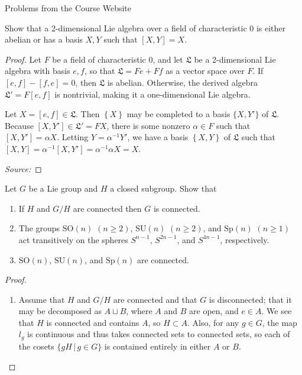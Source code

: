 \documentclass[12pt]{article}
\theoremstyle{definition}
\newenvironment{problem}[2][Problem]{\begin{trivlist}
\item[\hskip \labelsep {\bfseries #1}\hskip \labelsep {\bfseries #2.}]}{\end{trivlist}}
\begin{document}
\begin{section}{Problems from the Course Website}
	\begin{problem}{1}
		Show that a 2-dimensional Lie algebra over a field of characteristic $0$ is either abelian or has a basis $X,Y$ such that $[X,Y] = X$.	
		\begin{proof}
			Let $F$ be a field of characteristic $0$, and let $\mathfrak L$ be a 2-dimensional Lie algebra with basis $e,f$, so that $\mathfrak L = Fe + Ff$ as a vector space over $F$. If $[e,f] -[f,e] = 0$, then $\mathfrak L$ is abelian. Otherwise, the derived algebra $\mathfrak L' = F[e,f]$ is nontrivial, making it a one-dimensional Lie algebra.
			\par Let $X = [e,f] \in \mathfrak L$. Then $\left\{ X \right\}$ may be completed to a basis $\{X, Y'\}$ of $\mathfrak L$. Because $[X, Y'] \in \mathfrak L' = FX$, there is some nonzero $\alpha \in F$ such that $[X,Y'] = \alpha X$. Letting $Y = \alpha^{-1}Y'$, we have a basis $\left\{ X,Y \right\}$ of $\mathfrak L$ such that $[X,Y] = \alpha^{-1}[X,Y'] = \alpha^{-1}\alpha X =  X$.
		\par			\textit{Source:}\cite{jacobson}
		\end{proof}
	\end{problem}
	\begin{problem}{2}
		Let $G$ be a Lie group and $H$ a closed subgroup. Show that
		\begin{enumerate}[label=(\alph*)]
			\item If $H$ and $G/H$ are connected then $G$ is connected.
			\item The groups $\text{SO}(n)$ $(n \geq 2)$, $\text{SU}(n)$ $(n \geq 2)$, and $\text{Sp}(n)$ $(n \geq 1)$ act transitively on the spheres $S^{n-1}$, $S^{2n-1}$, and $S^{4n - 1}$, respectively.
			\item $\text{SO}(n)$, $\text{SU}(n)$, and $\text{Sp}(n)$ are connected.
		\end{enumerate}
		\begin{proof}
			\begin{enumerate}[label=(\alph*)]
				\item Assume that $H$ and $G/H$ are connected and that $G$ is disconnected; that it may be decomposed as $A \sqcup B$, where $A$ and $B$ are open, and $e \in A$. We see that $H$ is connected and contains $A$, so $H \subset A$. Also, for any $g \in G$, the map $l_g$ is continuous and thus takes connected sets to connected sets, so each of the cosets $\{gH \,\lvert\, g \in G\}$ is contained entirely in either $A$ or $B$. 

\end{enumerate}
\end{proof}
\end{problem}
\end{section}
\end{document}
